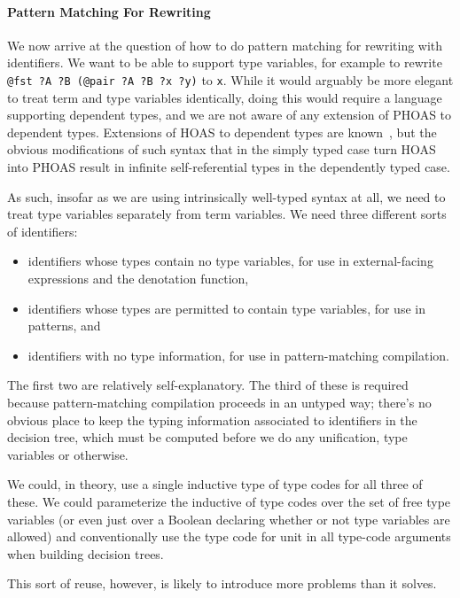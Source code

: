 \paragraph{Pattern Matching For Rewriting}
We now arrive at the question of how to do pattern matching for rewriting with identifiers.
We want to be able to support type variables, for example to rewrite \texttt{@fst ?A ?B (@pair ?A ?B ?x ?y)} to \texttt{x}.
While it would arguably be more elegant to treat term and type variables identically, doing this would require a language supporting dependent types, and we are not aware of any extension of PHOAS to dependent types.
Extensions of HOAS to dependent types are known~\cite{Outrageous2010McBride}, but the obvious modifications of such syntax that in the simply typed case turn HOAS into PHOAS result in infinite self-referential types in the dependently typed case.

As such, insofar as we are using intrinsically well-typed syntax at all, we need to treat type variables separately from term variables.
We need three different sorts of identifiers:
\begin{itemize}
\item
  identifiers whose types contain no type variables, for use in external-facing expressions and the denotation function,
\item
  identifiers whose types are permitted to contain type variables, for use in patterns, and
\item
  identifiers with no type information, for use in pattern-matching compilation.
\end{itemize}
The first two are relatively self-explanatory.
The third of these is required because pattern-matching compilation proceeds in an untyped way; there's no obvious place to keep the typing information associated to identifiers in the decision tree, which must be computed before we do any unification, type variables or otherwise.

We could, in theory, use a single inductive type of type codes for all three of these.
We could parameterize the inductive of type codes over the set of free type variables (or even just over a Boolean declaring whether or not type variables are allowed) and conventionally use the type code for unit in all type-code arguments when building decision trees.

This sort of reuse, however, is likely to introduce more problems than it solves.

